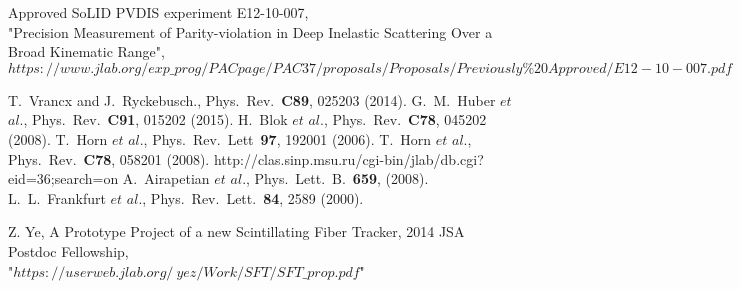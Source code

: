 \begin{thebibliography}{}
  Approved SoLID PVDIS experiment E12-10-007,\\
  "Precision Measurement of Parity-violation in Deep Inelastic Scattering Over a Broad Kinematic Range",\\
  $https://www.jlab.org/exp\_prog/PACpage/PAC37/proposals/Proposals/Previously\%20Approved/E12-10-007.pdf$


	        T.~Vrancx and J.~Ryckebusch., Phys.~Rev.~\textbf{C89}, 025203 (2014).
	G.~M.~Huber $\textit{et}$ $\textit{al}$., Phys.~Rev.~\textbf{C91}, 015202 (2015).
	H.~Blok $\textit{et}$ $\textit{al}$., Phys.~Rev.~\textbf{C78}, 045202 (2008).
	T.~Horn $\textit{et}$ $\textit{al}$., Phys.~Rev.~Lett~\textbf{97}, 192001 (2006).
	T.~Horn $\textit{et}$ $\textit{al}$., Phys.~Rev.~\textbf{C78}, 058201 (2008).
	        http://clas.sinp.msu.ru/cgi-bin/jlab/db.cgi?eid=36;search=on
	A.~Airapetian $\textit{et}$ $\textit{al}$., Phys.~Lett.~B.~\textbf{659}, (2008).
	L.~L.~Frankfurt $\textit{et}$ $\textit{al}$., Phys.~Rev.~Lett.~\textbf{84}, 2589 (2000).


 Z. Ye, A Prototype Project of a new Scintillating Fiber Tracker, 2014 JSA Postdoc Fellowship,\\ "$https://userweb.jlab.org/~yez/Work/SFT/SFT\_prop.pdf$"
\end{thebibliography}

